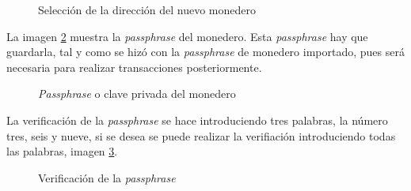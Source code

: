 \begin{figure}[H]
	\centering
	\caption{Selección de la dirección del nuevo monedero}
	\label{fig:wallet-13}
\end{figure}

La imagen \ref{fig:wallet-14} muestra la \textit{passphrase} del monedero. Esta \textit{passphrase} hay que guardarla, tal y como se hizó con la \textit{passphrase} de monedero importado, pues será necesaria para realizar transacciones posteriormente.

\begin{figure}[H]
	\centering
	\caption{\textit{Passphrase} o clave privada del monedero}
	\label{fig:wallet-14}
\end{figure}

\newpage
La verificación de la \textit{passphrase} se hace introduciendo tres palabras, la número tres, seis y nueve, si se desea se puede realizar la verifiación introduciendo todas las palabras, imagen \ref{fig:wallet-15}.

\begin{figure}[H]
	\centering
	\caption{Verificación de la \textit{passphrase}}
	\label{fig:wallet-15}
\end{figure}

